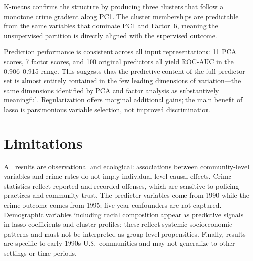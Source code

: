 \documentclass[11pt,letterpaper]{article}
\begin{document}
K-means confirms the structure by producing three clusters that follow a monotone crime gradient along PC1. The cluster memberships are predictable from the same variables that dominate PC1 and Factor~6, meaning the unsupervised partition is directly aligned with the supervised outcome.

Prediction performance is consistent across all input representations: 11 PCA scores, 7 factor scores, and 100 original predictors all yield ROC-AUC in the 0.906--0.915 range. This suggests that the predictive content of the full predictor set is almost entirely contained in the few leading dimensions of variation—the same dimensions identified by PCA and factor analysis as substantively meaningful. Regularization offers marginal additional gains; the main benefit of lasso is parsimonious variable selection, not improved discrimination.

\section{Limitations}

All results are observational and ecological: associations between community-level variables and crime rates do not imply individual-level causal effects. Crime statistics reflect reported and recorded offenses, which are sensitive to policing practices and community trust. The predictor variables come from 1990 while the crime outcome comes from 1995; five-year confounders are not captured. Demographic variables including racial composition appear as predictive signals in lasso coefficients and cluster profiles; these reflect systemic socioeconomic patterns and must not be interpreted as group-level propensities. Finally, results are specific to early-1990s U.S.\ communities and may not generalize to other settings or time periods.
\end{document}
